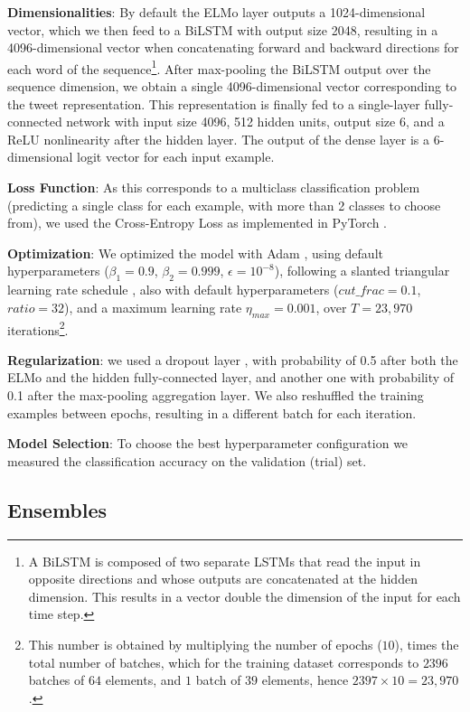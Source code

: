 \documentclass[11pt,a4paper]{article}
\begin{document}
\textbf{Dimensionalities}: By default the ELMo layer outputs a 1024-dimensional
vector, which we then feed to a BiLSTM with output size 2048, resulting in a
4096-dimensional vector when concatenating forward and backward directions for
each word of the sequence\footnote{A BiLSTM is composed of two separate LSTMs
that read the input in opposite directions and whose outputs are concatenated at
the hidden dimension. This results in a vector double the dimension of the input
for each time step.}. After max-pooling the BiLSTM output over the sequence
dimension, we obtain a single 4096-dimensional vector corresponding to the tweet
representation. This representation is finally fed to a single-layer
fully-connected network with input size 4096, 512 hidden units, output size 6,
and a ReLU nonlinearity after the hidden layer. The output of the dense layer is
a 6-dimensional logit vector for each input example.

\textbf{Loss Function}: As this corresponds to a multiclass classification
problem (predicting a single class for each example, with more than 2 classes to
choose from), we used the Cross-Entropy Loss as implemented in PyTorch
\cite{paszke2017automatic}.

\textbf{Optimization}: We optimized the model with Adam
\cite{DBLP:journals/corr/KingmaB14}, using default hyperparameters
($\beta_1=0.9$, $\beta_2=0.999$, $\epsilon=10^{-8}$), following a slanted
triangular learning rate schedule \cite{howard2018universal}, also with default
hyperparameters ($cut\_frac=0.1$, $ratio=32$), and a maximum learning rate
$\eta_{max}=0.001$, over $T=23,970$ iterations\footnote{This number is obtained
    by multiplying the number of epochs ($10$), times the total number of
    batches, which for the training dataset corresponds to $2396$ batches of
$64$ elements, and $1$ batch of $39$ elements, hence $2397\times10=23,970$.}.

\textbf{Regularization}: we used a dropout layer \cite{srivastava2014dropout},
with probability of 0.5 after both the ELMo and the hidden fully-connected
layer, and another one with probability of 0.1 after the max-pooling aggregation
layer. We also reshuffled the training examples between epochs, resulting in a
different batch for each iteration. 

\textbf{Model Selection}: To choose the best hyperparameter configuration we
measured the classification accuracy on the validation (trial) set. 


\subsection{Ensembles}
 
\end{document}
